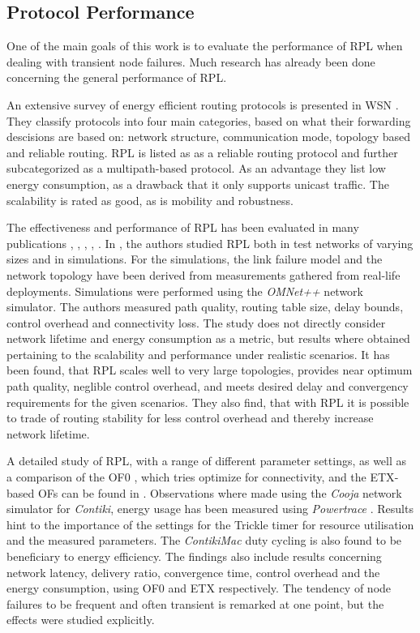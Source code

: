 \documentclass[
  a4paper,
  11pt,
  style=screen,
  extramargin,
  bcor=10mm,
  rgb,
  hyperrefdark,
  abstract=off,
  lnum,
]{tubsartcl}
\begin{document}
\subsection{Protocol Performance}

One of the main goals of this work is to evaluate the performance of \ac{RPL} when dealing with transient node failures.
Much research has already been done concerning the general performance of \ac{RPL}.

An extensive survey of energy efficient routing protocols is presented in \ac{WSN} \cite{pantazis2013energy}.
They classify protocols into four main categories, based on what their forwarding descisions are based on: network structure, communication mode, topology based and reliable routing.
\ac{RPL} is listed as as a reliable routing protocol and further subcategorized as a multipath-based protocol.
As an advantage they list low energy consumption, as a drawback that it only supports unicast traffic.
The scalability is rated as good, as is mobility and robustness.

The effectiveness and performance of \ac{RPL} has been evaluated in many publications \cite{rfc6687}, \cite{accettura2011performance}, \cite{korte2012study}, \cite{ali2012performance}, \cite{banh2015performance}.
In \cite{rfc6687}, the authors studied \ac{RPL} both in test networks of varying sizes and in simulations.
For the simulations, the link failure model and the network topology have been derived from measurements gathered from real-life deployments.
Simulations were performed using the \emph{OMNet++} \cite{varga2008overview} network simulator.
The authors measured path quality, routing table size, delay bounds, control overhead and connectivity loss.
The study does not directly consider network lifetime and energy consumption as a metric, but results where obtained pertaining to the scalability and performance under realistic scenarios.
It has been found, that \ac{RPL} scales well to very large topologies, provides near optimum path quality, neglible control overhead, and meets desired delay and convergency requirements for the given scenarios.
They also find, that with \ac{RPL} it is possible to trade of routing stability for less control overhead and thereby increase network lifetime.

A detailed study of \ac{RPL}, with a range of different parameter settings, as well as a comparison of the OF0 \cite{rfc6552}, which tries optimize for connectivity, and the \ac{ETX}-based \acp{OF} can be found in \cite{ali2012performance}.
Observations where made using the \emph{Cooja} \cite{osterlind2006cross} network simulator for \emph{Contiki}, energy usage has been measured using \emph{Powertrace} \cite{dunkels2011powertrace}.
Results hint to the importance of the settings for the Trickle timer for resource utilisation and the measured parameters.
The \emph{ContikiMac} \cite{dunkels2011contikimac} duty cycling is also found to be beneficiary to energy efficiency.
The findings also include results concerning network latency, delivery ratio, convergence time, control overhead and the energy consumption, using OF0 and \ac{ETX} respectively.
The tendency of node failures to be frequent and often transient is remarked at one point, but the effects were studied explicitly.
\end{document}
